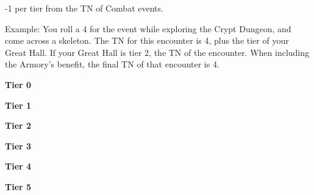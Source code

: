 -1 per tier from the TN of \tripip Combat events.
\skipline

Example: You roll a 4 for the event while exploring the Crypt Dungeon, and come across a skeleton. The TN for this encounter is 4, plus the tier of your Great Hall. If your Great Hall is tier 2, the TN of the encounter. When including the Armory’s benefit, the final TN of that encounter is 4.

\begin{tabbox}[4][4]
	
	\textbf{Tier 0}\\
	
	\skipline
	
	\textbf{Tier 1}\\
	
	\skipline
	
	\textbf{Tier 2}\\
	
	\skipline
	
	\textbf{Tier 3}\\
	
	\skipline
	
	\textbf{Tier 4}\\
	
	\skipline
	
	\textbf{Tier 5}\\
	
	\skipline
\end{tabbox}